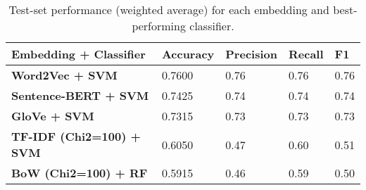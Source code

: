 \begin{table*}[!ht]
    \centering
    \begin{tabular}{|l|l|l|l|l|}
    \hline
    \textbf{Embedding + Classifier} & \textbf{Accuracy} & \textbf{Precision} & \textbf{Recall} & \textbf{F1} \\ \hline
    
    \textbf{Word2Vec + SVM}   & 0.7600  & 0.76  & 0.76  & 0.76  \\ 
    \textbf{Sentence-BERT + SVM}    & 0.7425  & 0.74  & 0.74  & 0.74  \\
    \textbf{GloVe + SVM}      & 0.7315  & 0.73  & 0.73  & 0.73  \\
    \textbf{TF-IDF (Chi2=100) + SVM} & 0.6050 & 0.47  & 0.60  & 0.51  \\
    \textbf{BoW (Chi2=100) + RF}    & 0.5915  & 0.46  & 0.59  & 0.50  \\ \hline

    \end{tabular}
    \caption{Test-set performance (weighted average) for each embedding and best-performing classifier.}
    \label{tab:final_results}
\end{table*}
